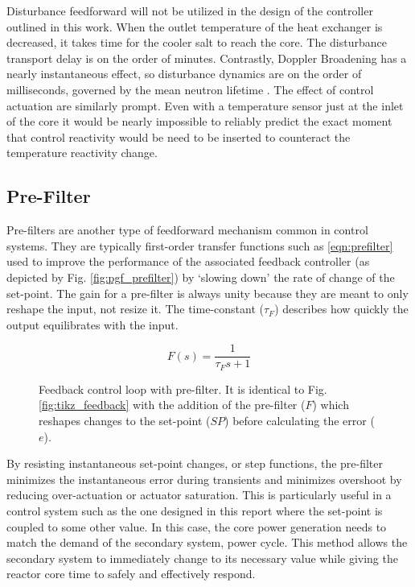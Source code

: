 Disturbance feedforward will not be utilized in the design of the controller outlined in this work. When the outlet temperature of the heat exchanger is decreased, it takes time for the cooler salt to reach the core. The disturbance transport delay is on the order of minutes. Contrastly, Doppler Broadening has a nearly instantaneous effect, so disturbance dynamics are on the order of milliseconds, governed by the mean neutron lifetime \cite[Ch. 7]{Lamarsh}. The effect of control actuation are similarly prompt. Even with a temperature sensor just at the inlet of the core it would be nearly impossible to reliably predict the exact moment that control reactivity would be need to be inserted to counteract the temperature reactivity change. 

\subsection{Pre-Filter}\label{sec:prefilter}
 Pre-filters are another type of feedforward mechanism common in control systems. They are typically first-order transfer functions such as \ref{eqn:prefilter} used to improve the performance of the associated feedback controller (as depicted by Fig. \ref{fig:pgf_prefilter}) by `slowing down' the rate of change of the set-point. The gain for a pre-filter is always unity because they are meant to only reshape the input, not resize it. The time-constant ($\tau_F$) describes how quickly the output equilibrates with the input. 

\begin{equation}\label{eqn:prefilter}
    F(s)=\frac{1}{\tau_F s+1}    
\end{equation}

\begin{figure}[!ht]
    \centering
    
    \caption[Feedback control loop with pre-filter]{Feedback control loop with pre-filter. It is identical to Fig. \ref{fig:tikz_feedback} with the addition of the pre-filter ($F$) which reshapes changes to the set-point ($SP$) before calculating the error ($e$).}
    \label{fig:tikz_prefilter}
\end{figure}

By resisting instantaneous set-point changes, or step functions, the pre-filter minimizes the instantaneous error during transients and minimizes overshoot by reducing over-actuation or actuator saturation.  This is particularly useful in a control system such as the one designed in this report where the set-point is coupled to some other value. In this case, the core power generation needs to match the demand of the secondary system, \eg power cycle. This method allows the secondary system to immediately change to its necessary value while giving the reactor core time to safely and effectively respond. 


